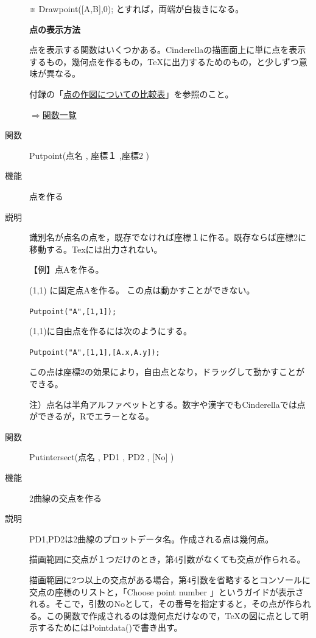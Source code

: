 \documentclass[papersize,a4paper,12pt,uplatex]{jsarticle}
\begin{document}
\begin{description}
※  Drawpoint([A,B],0);  とすれば，両端が白抜きになる。

\vspace{\baselineskip}
{\bf 点の表示方法}

点を表示する関数はいくつかある。Cinderellaの描画面上に単に点を表示するもの，幾何点を作るもの，TeXに出力するためのもの，と少しずつ意味が異なる。

付録の「\hyperlink{mkpttable}{点の作図についての比較表}」を参照のこと。

\begin{flushright}  \hyperlink{functionlist}{$\Rightarrow$関数一覧}\end{flushright}

\vspace{\baselineskip}
\hypertarget{putpoint}{}
\item[関数]  Putpoint(点名 , 座標１ ,座標2 )
\item[機能]  点を作る
\item[説明]  識別名が点名の点を，既存でなければ座標１に作る。既存ならば座標2に移動する。Texには出力されない。

\vspace{\baselineskip}
【例】点Aを作る。

(1,1) に固定点Aを作る。 この点は動かすことができない。

\hspace{10mm}   \verb|Putpoint("A",[1,1]);|
 
    (1,1)に自由点を作るには次のようにする。
    
\hspace{10mm}  \verb|Putpoint("A",[1,1],[A.x,A.y]);|
 
    この点は座標2の効果により，自由点となり，ドラッグして動かすことができる。

\vspace{\baselineskip}
注）点名は半角アルファベットとする。数字や漢字でもCinderellaでは点ができるが，Rでエラーとなる。

\vspace{\baselineskip}
\hypertarget{putintersect}{}
\item[関数]  Putintersect(点名 , PD1 , PD2 , [No] )
\item[機能]  2曲線の交点を作る
\item[説明]  PD1,PD2は2曲線のプロットデータ名。作成される点は幾何点。

描画範囲に交点が１つだけのとき，第4引数がなくても交点が作られる。

描画範囲に2つ以上の交点がある場合，第4引数を省略するとコンソールに交点の座標のリストと，「Choose point number 」というガイドが表示される。そこで，引数のNoとして，その番号を指定すると，その点が作られる。この関数で作成されるのは幾何点だけなので，\TeX の図に点として明示するためにはPointdata()で書き出す。


\end{description}
\end{document}
